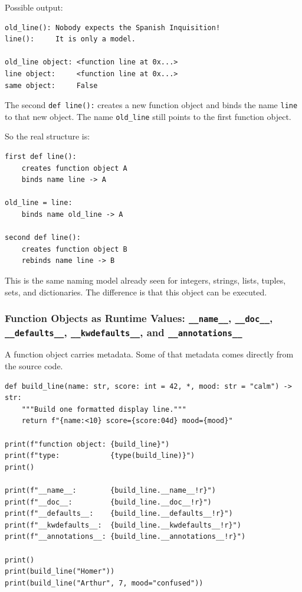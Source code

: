 Possible output:

\begin{verbatim}
old_line(): Nobody expects the Spanish Inquisition!
line():     It is only a model.

old_line object: <function line at 0x...>
line object:     <function line at 0x...>
same object:     False
\end{verbatim}

The second \texttt{def line():} creates a new function object and binds the name \texttt{line} to that new object. The name \texttt{old\_line} still points to the first function object.

So the real structure is:

\begin{verbatim}
first def line():
    creates function object A
    binds name line -> A

old_line = line:
    binds name old_line -> A

second def line():
    creates function object B
    rebinds name line -> B
\end{verbatim}

This is the same naming model already seen for integers, strings, lists, tuples, sets, and dictionaries. The difference is that this object can be executed.

\subsubsection{Function Objects as Runtime Values: \texttt{\_\_name\_\_}, \texttt{\_\_doc\_\_}, \texttt{\_\_defaults\_\_}, \texttt{\_\_kwdefaults\_\_}, and \texttt{\_\_annotations\_\_}}

A function object carries metadata. Some of that metadata comes directly from the source code.

\begin{verbatim}
def build_line(name: str, score: int = 42, *, mood: str = "calm") -> str:
    """Build one formatted display line."""
    return f"{name:<10} score={score:04d} mood={mood}"

print(f"function object: {build_line}")
print(f"type:            {type(build_line)}")
print()

print(f"__name__:        {build_line.__name__!r}")
print(f"__doc__:         {build_line.__doc__!r}")
print(f"__defaults__:    {build_line.__defaults__!r}")
print(f"__kwdefaults__:  {build_line.__kwdefaults__!r}")
print(f"__annotations__: {build_line.__annotations__!r}")

print()
print(build_line("Homer"))
print(build_line("Arthur", 7, mood="confused"))
\end{verbatim}

